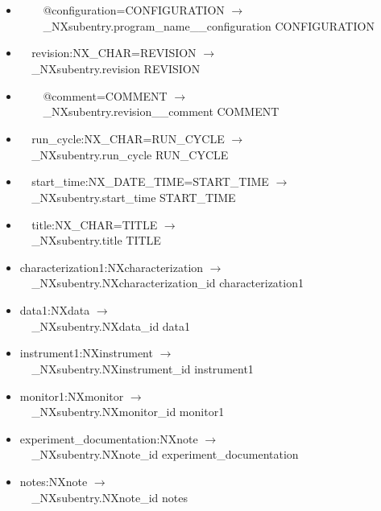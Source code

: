 \documentclass[11pt]{article}
\begin{document}
{{\begin{itemize}
\item{\verb|    |@configuration=CONFIGURATION $\rightarrow$\\
\verb|    |\_NXsubentry.program\_name\_\_configuration CONFIGURATION}

\item{\verb|  |revision:NX\_CHAR=REVISION $\rightarrow$\\
\verb|  |\_NXsubentry.revision REVISION}

\item{\verb|    |@comment=COMMENT $\rightarrow$\\
\verb|    |\_NXsubentry.revision\_\_comment COMMENT}

\item{\verb|  |run\_cycle:NX\_CHAR=RUN\_CYCLE $\rightarrow$\\
\verb|  |\_NXsubentry.run\_cycle RUN\_CYCLE}

\item{\verb|  |start\_time:NX\_DATE\_TIME=START\_TIME $\rightarrow$\\
\verb|  |\_NXsubentry.start\_time START\_TIME}

\item{\verb|  |title:NX\_CHAR=TITLE $\rightarrow$\\
\verb|  |\_NXsubentry.title TITLE}

\item{characterization1:NXcharacterization $\rightarrow$\\
\verb|  |\_NXsubentry.NXcharacterization\_id characterization1}

\item{data1:NXdata $\rightarrow$\\
\verb|  |\_NXsubentry.NXdata\_id data1}

\item{instrument1:NXinstrument $\rightarrow$\\
\verb|  |\_NXsubentry.NXinstrument\_id instrument1}

\item{monitor1:NXmonitor $\rightarrow$\\
\verb|  |\_NXsubentry.NXmonitor\_id monitor1}

\item{experiment\_documentation:NXnote $\rightarrow$\\
\verb|  |\_NXsubentry.NXnote\_id experiment\_documentation}

\item{notes:NXnote $\rightarrow$\\
\verb|  |\_NXsubentry.NXnote\_id notes}


\end{itemize}}}
\end{document}
